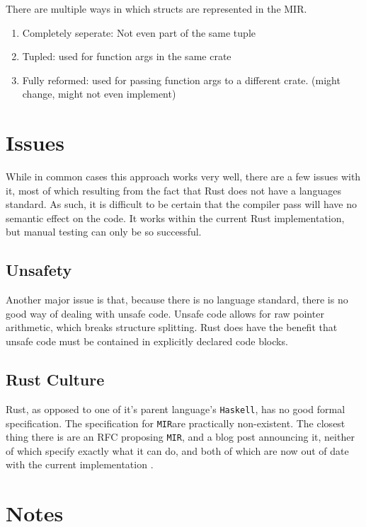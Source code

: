 \documentclass[12pt,final]{article}
\newcommand{\mir}{\texttt{MIR}}
\begin{document}
There are multiple ways in which structs are represented in the MIR. 
\begin{enumerate}
\item Completely seperate: Not even part of the same tuple
\item Tupled: used for function args in the same crate
\item Fully reformed: used for passing function args to a different crate. (might change, might not even implement)
\end{enumerate}
\section{Issues}

While in common cases this approach works very well, there are a few issues with
it, most of which resulting from the fact that Rust does not have a languages
standard. As such, it is difficult to be certain that the compiler pass will
have no semantic effect on the code. It works within the current Rust
implementation, but manual testing can only be so successful.

\subsection{Unsafety}
\label{sec:unsafe}


Another major issue is that, because there is no language standard, there is no
good way of dealing with unsafe code. Unsafe code allows for raw pointer
arithmetic, which breaks structure splitting. Rust does have the benefit that
unsafe code must be contained in explicitly declared code blocks.

\subsection{Rust Culture}
\label{sec:culture}

Rust, as opposed to one of it's parent language's \texttt{Haskell}, has no good
formal specification. The specification for \mir are practically non-existent.
The closest thing there is are an RFC proposing \mir, and a blog post announcing
it, neither of which specify exactly what it can do, and both of which are now
out of date with the current implementation .

\section{Notes}
\label{sec:remove}
\end{document}
